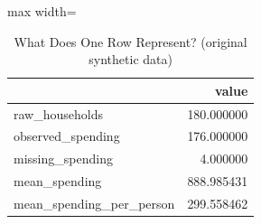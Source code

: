 \begin{table}[htbp]
\centering
\caption{What Does One Row Represent? (original synthetic data)}
\begingroup
\small
\setlength{\tabcolsep}{6pt}
\renewcommand{\arraystretch}{1.12}
\begin{adjustbox}{max width=\linewidth}
\begin{tabular}{@{}lr@{}}
\toprule
 & value \\
\midrule
raw\_households & 180.000000 \\
observed\_spending & 176.000000 \\
missing\_spending & 4.000000 \\
mean\_spending & 888.985431 \\
mean\_spending\_per\_person & 299.558462 \\
\bottomrule
\end{tabular}
\end{adjustbox}
\endgroup
\end{table}